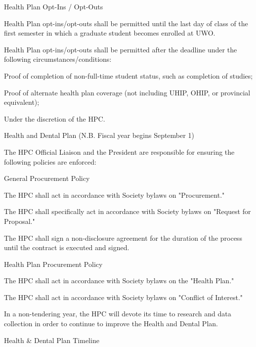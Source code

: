\begin{longenum}[ label*=\thesubsection.\arabic*., align=left] 
\item Health Plan Opt-Ins / Opt-Outs
	\begin{longenum}[label*=\arabic*., align=left]
	\item Health Plan opt-ins/opt-outs shall be permitted until the last day of class of the first semester in which a graduate student becomes enrolled at UWO.
	\item Health Plan opt-ins/opt-outs shall be permitted after the deadline under the following circumstances/conditions:
		\begin{longenum}[label*=\arabic*., align=left]
		\item Proof of completion of non-full-time student status, such as completion of studies;
		\item Proof of alternate health plan coverage (not including UHIP, OHIP, or provincial equivalent);
		\item Under the discretion of the HPC.
		\end{longenum}
	\end{longenum} 

\item Health and Dental Plan (N.B. Fiscal year begins September 1)
	\begin{longenum}[label*=\arabic*., align=left]
	\item The HPC Official Liaison and the President are responsible for ensuring the following policies are enforced:
		\begin{longenum}[label*=\arabic*., align=left]
		\item General Procurement Policy
			\begin{longenum}[label*=\arabic*., align=left]
			\item The HPC shall act in accordance with Society bylaws on "Procurement."
			\item The HPC shall specifically act in accordance with Society bylaws on "Request for Proposal."
			\item The HPC shall sign a non-disclosure agreement for the duration of the process until the contract is executed and signed.
			\end{longenum}
		\item Health Plan Procurement Policy
			\begin{longenum}[label*=\arabic*., align=left]
			\item The HPC shall act in accordance with Society bylaws on the "Health Plan."
			\item The HPC shall act in accordance with Society bylaws on "Conflict of Interest."
			\end{longenum}
		\end{longenum}
	\item In a non-tendering year, the HPC will devote its time to research and data collection in order to continue to improve the Health and Dental Plan.
	\item Health \& Dental Plan Timeline


\end{longenum}
\end{longenum}
